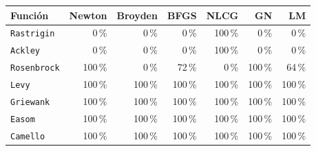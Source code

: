 \begin{tabular}{l r r r r r r}
\toprule
\rowcolor{Azul1!50}
Función & Newton & Broyden & BFGS & NLCG & GN & LM \\
\midrule
\texttt{Rastrigin} & 0\,\% & 0\,\% & 0\,\% & 100\,\% & 0\,\% & 0\,\% \\
\texttt{Ackley} & 0\,\% & 0\,\% & 0\,\% & 100\,\% & 0\,\% & 0\,\% \\
\texttt{Rosenbrock} & 100\,\% & 0\,\% & 72\,\% & 0\,\% & 100\,\% & 64\,\% \\
\texttt{Levy} & 100\,\% & 100\,\% & 100\,\% & 100\,\% & 100\,\% & 100\,\% \\
\texttt{Griewank} & 100\,\% & 100\,\% & 100\,\% & 100\,\% & 100\,\% & 100\,\% \\
\texttt{Easom} & 100\,\% & 100\,\% & 100\,\% & 100\,\% & 100\,\% & 100\,\% \\
\texttt{Camello} & 100\,\% & 100\,\% & 100\,\% & 100\,\% & 100\,\% & 100\,\% \\
\bottomrule
\end{tabular}
